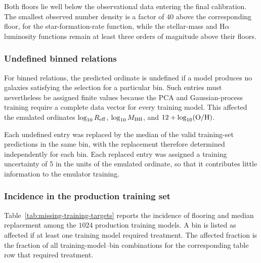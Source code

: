 \documentclass[twocolumn, apj, numberedappendix, iop]{openjournal}
\newcommand{\ha}{H$\alpha$}
\begin{document}
Both floors lie well below the observational data entering the final
calibration. The smallest observed number density is a factor of \(40\) above
the corresponding floor, for the star-formation-rate function, while the
stellar-mass and \ha{} luminosity functions remain at least three orders of
magnitude above their floors.

\subsubsection{Undefined binned relations}

For binned relations, the predicted ordinate is undefined if a model produces
no galaxies satisfying the selection for a particular bin. Such entries must
nevertheless be assigned finite values because the PCA and
Gaussian-process training require a complete data vector for every training
model. This affected the emulated ordinates
\(\log_{10}R_{\rm eff}\), \(\log_{10}M_{\rm BH}\), and
\(12+\log_{10}({\rm O/H})\).

Each undefined entry was replaced by the median of the valid training-set predictions in the same bin, with the replacement therefore determined independently for each bin. Each replaced entry was assigned a training uncertainty of 5 in the units of the emulated ordinate, so that it contributes little information to the emulator training.

\subsubsection{Incidence in the production training set}

Table~\ref{tab:missing-training-targets} reports the incidence of flooring and
median replacement among the \(1024\) production training models. A bin is
listed as affected if at least one training model required treatment. The
affected fraction is the fraction of all training-model--bin combinations for
the corresponding table row that required treatment.
\end{document}
